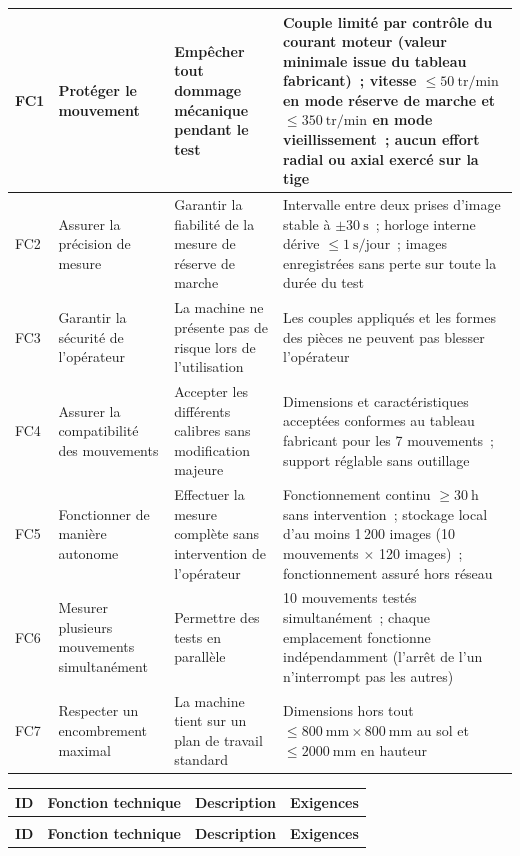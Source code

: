 \begin{landscape}
\begin{longtable}{|>{\raggedright\arraybackslash}p{1.5cm}|p{4cm}|p{6cm}|p{8cm}|}
FC1 & Protéger le mouvement
    & Empêcher tout dommage mécanique pendant le test
    & Couple limité par contrôle du courant moteur (valeur minimale issue du tableau fabricant)~; vitesse $\leq 50\ \mathrm{tr/min}$ en mode réserve de marche et $\leq 350\ \mathrm{tr/min}$ en mode vieillissement~; aucun effort radial ou axial exercé sur la tige \\
\hline
FC2 & Assurer la précision de mesure
    & Garantir la fiabilité de la mesure de réserve de marche
    & Intervalle entre deux prises d'image stable à $\pm 30\ \mathrm{s}$~; horloge interne dérive $\leq 1\ \mathrm{s/jour}$~; images enregistrées sans perte sur toute la durée du test \\
\hline
FC3 & Garantir la sécurité de l'opérateur
    & La machine ne présente pas de risque lors de l'utilisation
    & Les couples appliqués et les formes des pièces ne peuvent pas blesser l'opérateur \\
\hline
FC4 & Assurer la compatibilité des mouvements
    & Accepter les différents calibres sans modification majeure
    & Dimensions et caractéristiques acceptées conformes au tableau fabricant pour les 7 mouvements~; support réglable sans outillage \\
\hline
FC5 & Fonctionner de manière autonome
    & Effectuer la mesure complète sans intervention de l'opérateur
    & Fonctionnement continu $\geq 30\ \mathrm{h}$ sans intervention~; stockage local d'au moins 1\,200 images (10 mouvements $\times$ 120 images)~; fonctionnement assuré hors réseau \\
\hline
FC6 & Mesurer plusieurs mouvements simultanément
    & Permettre des tests en parallèle
    & 10 mouvements testés simultanément~; chaque emplacement fonctionne indépendamment (l'arrêt de l'un n'interrompt pas les autres) \\
\hline
FC7 & Respecter un encombrement maximal
    & La machine tient sur un plan de travail standard
    & Dimensions hors tout $\leq 800\ \mathrm{mm} \times 800\ \mathrm{mm}$ au sol et $\leq 2000\ \mathrm{mm}$ en hauteur \\
\end{longtable}
\begin{longtable}{|>{\raggedright\arraybackslash}p{1.5cm}|p{4cm}|p{6cm}|p{6cm}|}
\toprule
\textbf{ID} & \textbf{Fonction technique} & \textbf{Description} & \textbf{Exigences} \\
\midrule
\endfirsthead

\multicolumn{4}{c}{\tablename\ \thetable{} (suite)} \\
\toprule
\textbf{ID} & \textbf{Fonction technique} & \textbf{Description} & \textbf{Exigences} \\
\midrule
\endhead


\end{longtable}
\end{landscape}
